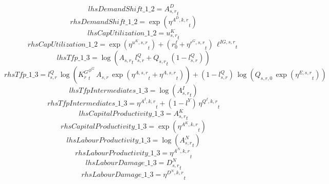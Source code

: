 \begin{dmath*}
lhsDemandShift\_1\_2 = {{A^{D}_{s,r}}}_{t}
\end{dmath*}
\begin{dmath*}
rhsDemandShift\_1\_2 = \exp\left({{\eta^{A^{D},k,r}}}_{t}\right)
\end{dmath*}
\begin{dmath*}
lhsCapUtilization\_1\_2 = {{u^K_{s,r}}}_{t}
\end{dmath*}
\begin{dmath*}
rhsCapUtilization\_1\_2 = \exp\left({{\eta^{u^K,s,r}}}_{t}\right)+\left({{r^f_0}}+{{\eta^{r^G,s,r}}}_{t}\right)\, {{\ell^{IG,s,r}}}_{t}
\end{dmath*}
\begin{dmath*}
lhsTfp\_1\_3 = \log\left({{A_{s,r}}}_{t}\, {{l^{Q}_{s,r}}}+{{Q_{s,r}}}_{t}\, \left(1-{{l^{Q}_{s,r}}}\right)\right)
\end{dmath*}
\begin{dmath*}
rhsTfp\_1\_3 = {{l^{Q}_{s,r}}}\, \log\left({{K^G_{r}}}_{t}^{{{\phi^{G}}}}\, {{A_{s,r}}}\, \exp\left({{\eta^{A,s,r}}}_{t}+{{\eta^{A,s,r}}}_{t}\right)\right)+\left(1-{{l^{Q}_{s,r}}}\right)\, \log\left({{Q_{s,r,0}}}\, \exp\left({{\eta^{E,s,r}}}_{t}\right)\right)
\end{dmath*}
\begin{dmath*}
lhsTfpIntermediates\_1\_3 = \log\left({{A^{I}_{s,r}}}_{t}\right)
\end{dmath*}
\begin{dmath*}
rhsTfpIntermediates\_1\_3 = {{\eta^{A^{I},k,r}}}_{t}+\left(1-{{l^{Y}}}\right)\, {{\eta^{Q^{I},k,r}}}_{t}
\end{dmath*}
\begin{dmath*}
lhsCapitalProductivity\_1\_3 = {{A^{K}_{s,r}}}_{t}
\end{dmath*}
\begin{dmath*}
rhsCapitalProductivity\_1\_3 = \exp\left({{\eta^{A^{K},k,r}}}_{t}\right)
\end{dmath*}
\begin{dmath*}
lhsLabourProductivity\_1\_3 = \log\left({{A^{N}_{s,r}}}_{t}\right)
\end{dmath*}
\begin{dmath*}
rhsLabourProductivity\_1\_3 = {{\eta^{A^{N},k,r}}}_{t}
\end{dmath*}
\begin{dmath*}
lhsLabourDamage\_1\_3 = {{D^N_{s,r}}}_{t}
\end{dmath*}
\begin{dmath*}
rhsLabourDamage\_1\_3 = {{\eta^{D^{N},k,r}}}_{t}
\end{dmath*}

